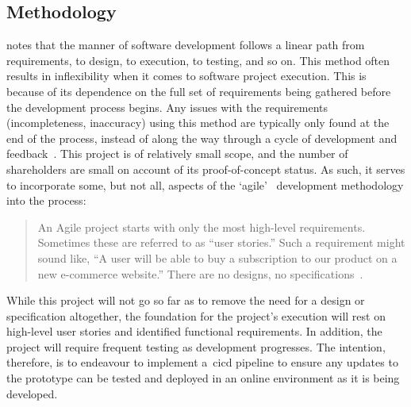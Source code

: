 \subsection{Methodology}\label{subsec:methodology}

\citet{murray-pm} notes that the  manner of software development follows a linear path from requirements, to design, to execution, to testing, and so on.
This method often results in inflexibility when it comes to software project execution.
This is because of its dependence on the full set of requirements being gathered before the development process begins.
Any issues with the requirements (incompleteness, inaccuracy) using this method are typically only found at the end of the process, instead of along the way through a cycle of development and feedback~\citep{murray-pm}.
This project is of relatively small scope, and the number of shareholders are small on account of its proof-of-concept status.
As such, it serves to incorporate some, but not all, aspects of the `\gls{agile}'~\citep{beck2001agile} development methodology into the process:

\begin{quotation}
    An Agile project starts with only the most high-level requirements.
    Sometimes these are referred to as “user stories.”
    Such a requirement might sound like, “A user will be able to buy a subscription to our product on a new e-commerce website.”
    There are no designs, no specifications~\citep{murray-pm}.
\end{quotation}

While this project will not go so far as to remove the need for a design or specification altogether, the foundation for the project’s execution will rest on high-level user stories and identified functional requirements.
In addition, the project will require frequent testing as development progresses.
The intention, therefore, is to endeavour to implement a~\gls{cicd} pipeline to ensure any updates to the prototype can be tested and deployed in an online environment as it is being developed.
